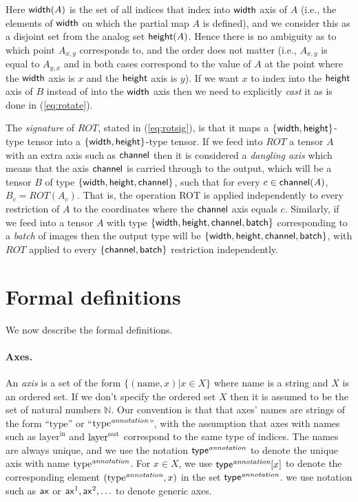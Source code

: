 \documentclass{article}
\newcommand{\annot}[1]{\text{\it #1}}
\begin{document}
Here $\mathsf{width}(A)$ is the set of all indices that index into $\mathsf{width}$ axis of $A$ (i.e., the elements of $\mathsf{width}$ on which the partial map $A$ is defined), and we consider this as a disjoint set from the analog set $\mathsf{height}(A)$. Hence there is no ambiguity as to which point $A_{x,y}$ corresponds to, and the order does not matter (i.e., $A_{x,y}$ is equal to $A_{y,x}$ and in both cases correspond to the value of $A$ at the point where the $\mathsf{width}$ axis is $x$ and the $\mathsf{height}$ axis is $y$).
If we want $x$ to index into the $\mathsf{height}$ axis of $B$ instead of into the $\mathsf{width}$ axis then we need to explicitly \emph{cast} it as is done in (\ref{eq:rotate}).

The \emph{signature} of $ROT$, stated in (\ref{eq:rotsig}), is that it maps a $\{ \mathsf{width} , \mathsf{height} \}$-type tensor into a $\{ \mathsf{width} , \mathsf{height} \}$-type tensor.
If we feed into $ROT$ a tensor $A$ with an extra axis such as $\mathsf{channel}$ then it is considered a \emph{dangling axis} which means that the axis $\mathsf{channel}$ is carried through to the output, which will be a tensor $B$ of type $\{ \mathsf{width} , \mathsf{height}  , \mathsf{channel} \}$, such that for every $c \in \mathsf{channel}(A)$, $B_c = ROT(A_c)$. 
That is, the operation ROT is applied independently to every restriction of $A$ to the coordinates where the $\mathsf{channel}$ axis equals $c$.
Similarly, if we feed into a tensor $A$ with type $\{ \mathsf{width} , \mathsf{height} , \mathsf{channel} , \mathsf{batch} \}$ corresponding to a \emph{batch} of images then the output type will be $\{ \mathsf{width} , \mathsf{height} , \mathsf{channel} , \mathsf{batch} \}$, with $ROT$ applied to every $\{ \mathsf{channel},\mathsf{batch} \}$ restriction independently.

\section{Formal definitions}

We now describe the formal definitions. 

\paragraph{Axes.} An \emph{axis} is a set of the form $\{ (\text{name}  ,x ) | x\in X \}$ where $\text{name}$ is a string  and  $X$ is an ordered set. 
If we don't specify the ordered set $X$ then it is assumed to be the set of natural numbers $\mathbb{N}$.
Our convention is that that axes' names are strings of the form ``$\text{type}$'' or ``$\text{type}^{\annot{annotation}}$'', with the assumption that axes with names such as $\text{layer}^{\text{in}}$ and $\mathsf{\text{layer}}^{\text{out}}$ correspond to the same type of indices.
The names are always unique, and we use the notation $\name{type}^{\annot{annotation}}$ to denote the unique axis with name $\text{type}^{\annot{annotation}}$.
For $x\in X$, we use $\name{type}^{\annot{annotation}}[x]$ to denote the corresponding element $(\text{type}^{\annot{annotation}}, x)$ in the set $\name{type}^{\annot{annotation}}$.
we use notation such as $\mathsf{ax}$ or  $\mathsf{ax}^1,\mathsf{ax}^2,\ldots$ to denote generic axes.
\end{document}
